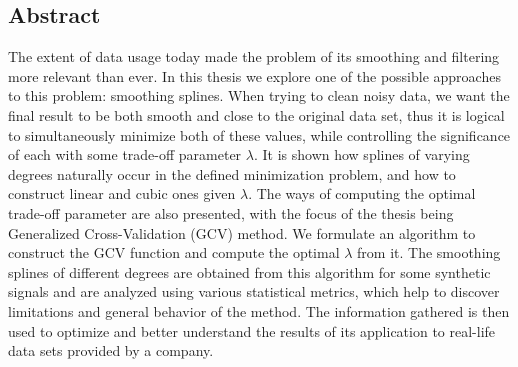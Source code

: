 \documentclass[11pt,leqno]{book}
\theoremstyle{definition}
\theoremstyle{plain}
\theoremstyle{definition}
\begin{document}
\vspace*{4cm}
\begin{center}
\section*{Abstract}
\end{center}
{The extent of data usage today made the problem of its smoothing and filtering more relevant than ever. In this thesis we explore one of the possible approaches to this problem: smoothing splines. When trying to clean noisy data, we want the final result to be both smooth and close to the original data set, thus it is logical to simultaneously minimize both of these values, while controlling the significance of each with some trade-off parameter $\lambda.$ It is shown how splines of varying degrees naturally occur in the defined minimization problem, and how to construct linear and cubic ones given $\lambda.$ The ways of computing the optimal trade-off parameter are also presented, with the focus of the thesis being Generalized Cross-Validation (GCV) method. We formulate an algorithm to construct the GCV function and compute the optimal $\lambda$ from it. The smoothing splines of different degrees are obtained from this algorithm for some synthetic signals and are analyzed using various statistical metrics, which help to discover limitations and general behavior of the method. The information gathered is then used to optimize and better understand the results of its application to real-life data sets provided by a company.

\vspace*{\fill}
\clearpage
\newpage
\vspace*{4cm}
\begin{center}

\end{center}}
\end{document}
